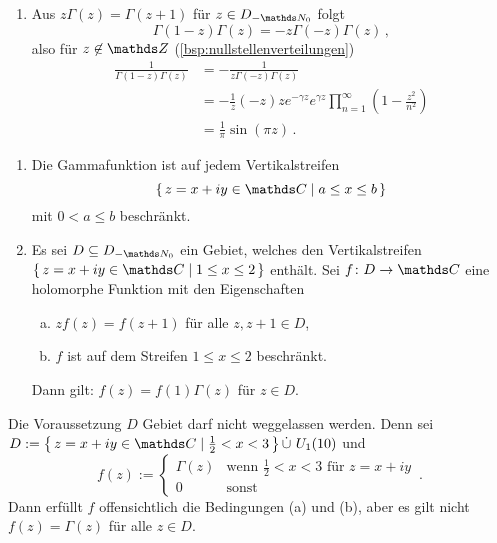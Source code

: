 \begin{bewe}
\begin{enumerate}
\item Aus $z\Gamma(z) = \Gamma(z+1)$ für $z\in D_{-\NN_0}$ folgt
\[
	\Gamma(1-z)\Gamma(z)
	= -z \Gamma(-z)\Gamma(z)
	\,,
\]
also für $z\not\in \ZZ$ (\autoref{bsp:nullstellenverteilungen})
\begin{align*}
	\frac{1}{\Gamma(1-z)\Gamma(z)}
	&= -\frac{1}{z\Gamma(-z)\Gamma(z)} \\
	&= -\frac{1}{z}(-z)ze^{-\gamma z}e^{\gamma z}\prod_{n=1}^\infty \left(1-\frac{z^2}{n^2}\right) \\
	&= \frac{1}{\pi} \sin(\pi z)
	\,.
\end{align*}
\end{enumerate}
\end{bewe}

\begin{satz}
\begin{enumerate}
\item Die Gammafunktion ist auf jedem Vertikalstreifen
\[
	\Set{z=x+iy \in\CC \mid a \leq x \leq b}
\]
mit $0 < a \leq b$ beschränkt.

\item Es sei $D\subseteq D_{-\NN_0}$ ein Gebiet, welches den Vertikalstreifen $\Set{z=x+iy \in\CC \mid 1 \leq x \leq 2}$ enthält.
Sei $f\colon D\ra \CC$ eine holomorphe Funktion mit den Eigenschaften
\begin{enumerate}[(a)]
\item $zf(z) = f(z+1)$ für alle $z, z+1\in D$,
\item $f$ ist auf dem Streifen $1\leq x \leq 2$ beschränkt.
\end{enumerate}
Dann gilt:
$f(z) = f(1) \Gamma(z)$ für $z\in D$.
\end{enumerate}
\end{satz}

\begin{beme}
Die Voraussetzung $D$ Gebiet darf nicht weggelassen werden.
Denn sei $D := \Set{z = x+iy\in\CC \mid \frac{1}{2} < x < 3} \dot\cup\ U_1(10)$ und
\[
	f(z) :=
	\begin{cases}
		\Gamma(z) &\text{wenn } \frac{1}{2} < x < 3 \text{ für } z=x+iy \\
		0 &\text{sonst}
	\end{cases}
	\,.
\]
Dann erfüllt $f$ offensichtlich die Bedingungen (a) und (b), aber es gilt nicht $f(z) = \Gamma(z)$ für alle $z\in D$.
\end{beme}

